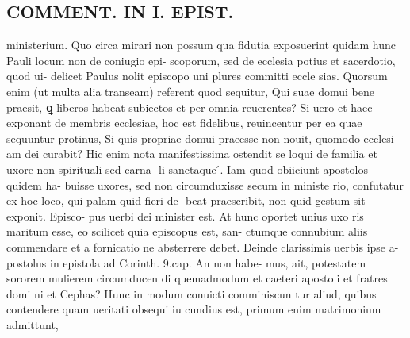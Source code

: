 \documentclass{article}
\begin{document}
\begin{pages}
\section*{COMMENT. IN I. EPIST. }\pstart ministerium. Quo circa mirari non possum qua fidutia exposuerint quidam hunc Pauli locum non de coniugio epi- scoporum, sed de ecclesia potius et sacerdotio, quod ui- delicet Paulus nolit episcopo uni plures committi eccle sias. Quorsum enim (ut multa alia transeam) referent quod sequitur, Qui suae domui bene praesit, ꝗ liberos habeat subiectos et per omnia reuerentes? Si uero et haec exponant de membris ecclesiae, hoc est fidelibus, reuincentur per ea quae sequuntur protinus, Si quis propriae domui praeesse non nouit, quomodo ecclesi- am dei curabit? Hic enim nota manifestissima ostendit se loqui de familia et uxore non spirituali sed carna- li sanctaque ́. Iam quod obiiciunt apostolos quidem ha- buisse uxores, sed non circumduxisse secum in ministe rio, confutatur ex hoc loco, qui palam quid fieri de- beat praescribit, non quid gestum sit exponit. Episco- pus uerbi dei minister est. At hunc oportet unius uxo ris maritum esse, eo scilicet quia episcopus est, san- ctumque connubium aliis commendare et a fornicatio ne absterrere debet. Deinde clarissimis uerbis ipse a- postolus in epistola ad Corinth. 9.cap. An non habe- mus, ait, potestatem sororem mulierem circumducen di quemadmodum et caeteri apostoli et fratres domi ni et Cephas? Hunc in modum conuicti comminiscun tur aliud, quibus contendere quam ueritati obsequi iu cundius est, primum enim matrimonium admittunt,  \pend

\end{pages}
\end{document}
